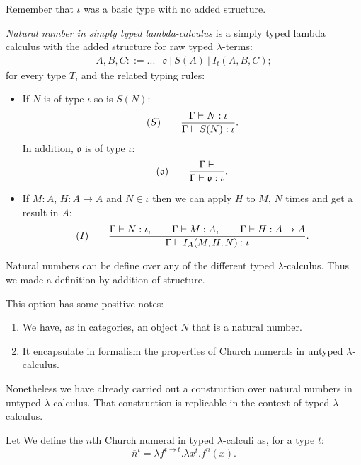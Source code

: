 \begin{definition}
\begin{remark}
  Remember that $\iota$ was a basic type with no added structure.
\end{remark}
\begin{definition}
  \emph{Natural number in simply typed lambda-calculus} is a simply typed lambda calculus with the added structure for raw typed $\lambda$-terms:
  \begin{align*}
    A,B, C ::= ...\ |\ \mathfrak{o}\ |\ S(A)\ |\ I_t(A,B,C);
  \end{align*}
for every type $T$, and the related typing rules:
  \begin{itemize}
  \item If $N$ is of type $\iota$ so is $S(N)$:
    $$  (S)\qquad  {\displaystyle\Gamma \vdash N:\iota \over \Gamma \vdash S(N):\iota}.$$
    In addition, $\mathfrak{o}$ is of type $\iota$:
    $$  (\mathfrak{o})\qquad  {\displaystyle\Gamma \vdash \over \Gamma \vdash \mathfrak{o}:\iota}.$$
  \item If $M: A$, $H: A\to A$ and $N\in \iota$ then we can apply $H$ to $M$, $N$ times and get a result in $A$:
        $$  (I)\qquad  {\displaystyle\Gamma \vdash N:\iota, \qquad \Gamma \vdash M:A,\qquad \Gamma \vdash H:A\to A \over \Gamma \vdash I_A(M,H,N):\iota}.$$
  \end{itemize}
\end{definition}

\begin{remark} \label{remark-natural-numbers}
  Natural numbers can be define over any of the different typed $\lambda$-calculus. Thus we made a definition by addition of structure. 
\end{remark}

This option has some positive notes:
\begin{enumerate}
\item We have, as in categories, an object $N$ that is a natural number.
\item It encapsulate in formalism the properties of Church numerals in untyped $\lambda$-calculus.
\end{enumerate}

Nonetheless we have already carried out a construction over natural numbers in untyped $\lambda$-calculus. That construction is replicable in the context of typed $\lambda$-calculus.

\begin{definition}
  Let We define the $n$th Church numeral in typed $\lambda$-calculi as, for a type $t$:
  $$\overline n^t = \lambda f^{t \to t}. \lambda x^{t}. f^{n}(x).$$
  

\end{definition}
\end{definition}
